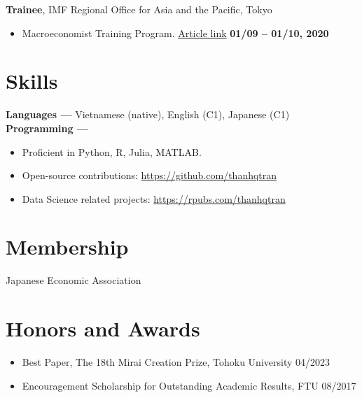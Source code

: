 \documentclass[margin,line]{res}
\begin{document}
\begin{resume}
\vspace*{.05in}
{\bf Trainee}, IMF Regional Office for Asia and the Pacific, Tokyo
\vspace*{.05in}
\begin{itemize}
\item[ ] Macroeconomist Training Program. \href{https://www.imf.org/en/Countries/ResRep/OAP-Home/~/link.aspx?_id=C2F64E8412B64A86BD37DDEB8439312B&_z=z}{Article link} \hfill {\bf 01/09 -- 01/10, 2020}
\end{itemize}

\vspace{4mm}








\section{\sc Skills}
{\bf Languages ---}
\vspace*{.05in}
Vietnamese (native), English (C1), Japanese (C1)\\
{\bf Programming ---}
\vspace*{.05in}
\begin{itemize}
	\item Proficient in Python, R, Julia, MATLAB.
	\item Open-source contributions: \url{https://github.com/thanhqtran}
	\item Data Science related projects: \url{https://rpubs.com/thanhqtran}
\end{itemize}

\vspace{4mm}

\section{\sc Membership}
 Japanese Economic Association \\

\section{\sc Honors and Awards}
\begin{itemize}
\item[] Best Paper, The 18th Mirai Creation Prize, Tohoku University \hfill 04/2023
\item[] Encouragement Scholarship for Outstanding Academic Results, FTU \hfill 08/2017
\end{itemize}


\end{resume}
\end{document}

